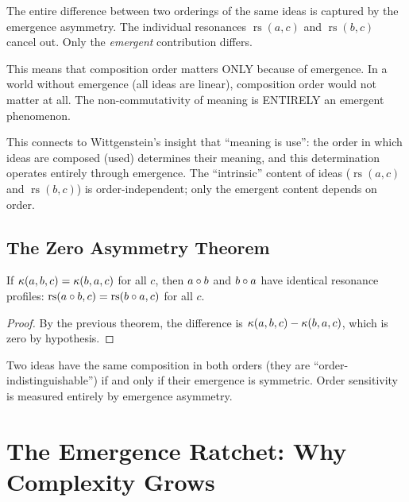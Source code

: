 \begin{interpretation}
The entire difference between two orderings of the same ideas is captured by the emergence asymmetry. The individual resonances $\operatorname{rs}(a,c)$ and $\operatorname{rs}(b,c)$ cancel out. Only the \emph{emergent} contribution differs.

This means that composition order matters ONLY because of emergence. In a world without emergence (all ideas are linear), composition order would not matter at all. The non-commutativity of meaning is ENTIRELY an emergent phenomenon.

This connects to Wittgenstein's insight that ``meaning is use'': the order in which ideas are composed (used) determines their meaning, and this determination operates entirely through emergence. The ``intrinsic'' content of ideas ($\operatorname{rs}(a,c)$ and $\operatorname{rs}(b,c)$) is order-independent; only the emergent content depends on order.
\end{interpretation}

\section{The Zero Asymmetry Theorem}

\begin{theorem}
If $\kappa(a,b,c) = \kappa(b,a,c)$ for all $c$, then $a \circ b$ and $b \circ a$ have identical resonance profiles: $\operatorname{rs}(a \circ b, c) = \operatorname{rs}(b \circ a, c)$ for all $c$.
\end{theorem}

\begin{proof}
By the previous theorem, the difference is $\kappa(a,b,c) - \kappa(b,a,c)$, which is zero by hypothesis.
\end{proof}

\begin{corollary}
Two ideas have the same composition in both orders (they are ``order-indistinguishable'') if and only if their emergence is symmetric. Order sensitivity is measured entirely by emergence asymmetry.
\end{corollary}


\chapter{The Emergence Ratchet: Why Complexity Grows}

